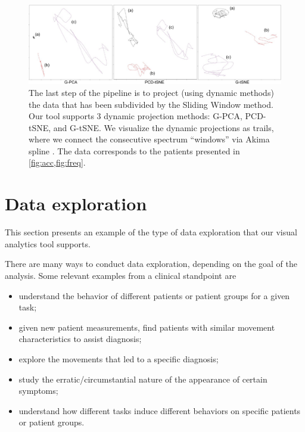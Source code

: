 \begin{figure}[ht]
\centering
\includegraphics[width=\linewidth]{figures/nemo/nemo1-projections.pdf}
\caption{The last step of the pipeline is to project (using dynamic methods) the data that has been subdivided by the Sliding Window method. Our tool supports 3 dynamic projection methods: G-PCA, PCD-tSNE, and G-tSNE. We visualize the dynamic projections as trails, where we connect the consecutive spectrum ``windows'' via Akima spline \citep{akima}. The data corresponds to the patients presented in \cref{fig:acc,fig:freq}.}
\label{fig:nemo1-projections}
\end{figure}

\section{Data exploration}
\label{sec:nemo_data_exploration}
%
This section presents an example of the type of data exploration that our visual analytics tool supports. 


There are many ways to conduct data exploration, depending on the goal of the analysis. Some relevant examples from a clinical standpoint are
\begin{itemize}
  \item understand the behavior of different patients or patient groups for a given task; 
  \item given new patient measurements, find patients with similar movement characteristics to assist diagnosis;
  \item explore the movements that led to a specific diagnosis;
  \item study the erratic/circumstantial nature of the appearance of certain symptoms;
  \item understand how different tasks induce different behaviors on specific patients or patient groups. 
\end{itemize}

